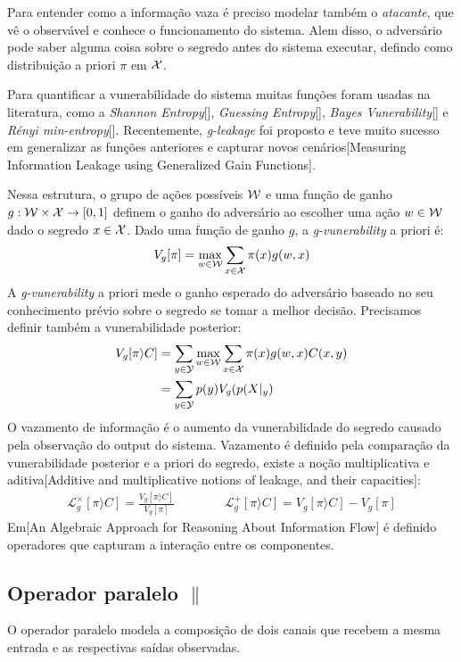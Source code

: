 Para entender como a informação vaza é preciso modelar também o \emph{atacante}, que vê o observável e conhece o funcionamento do sistema. Alem disso, o adversário pode saber alguma coisa sobre o segredo antes do sistema executar, defindo como distribuição a priori $\pi$ em $\mathcal{X}$.

Para quantificar a vunerabilidade do sistema muitas funções foram usadas na literatura, como a \emph{Shannon Entropy}[], \emph{Guessing Entropy}[], \emph{Bayes Vunerability}[] e \emph{Rényi min-entropy}[]. Recentemente, \emph{g-leakage} foi proposto e teve muito sucesso em generalizar as funções anteriores e capturar novos cenários[Measuring Information Leakage using Generalized Gain Functions].

Nessa estrutura, o grupo de ações possíveis $\mathcal{W}$ e uma função de ganho $g:\mathcal{W} \times \mathcal{X} \rightarrow [0,1]$ definem o ganho do adversário ao escolher uma ação $w\in\mathcal{W}$ dado o segredo $x\in\mathcal{X}$. Dado uma função de ganho $g$, a \emph{g-vunerability} a priori é:
$$ V_g[\pi] = \max_{w\in\mathcal{W}} \sum_{x\in\mathcal{X}} \pi(x)g(w,x) $$
A \emph{g-vunerability} a priori mede o ganho esperado do adversário baseado no seu conhecimento prévio sobre o segredo se tomar a melhor decisão. Precisamos definir também a vunerabilidade posterior:
\begin{align*}
V_g[\pi\rangle C]  & = \sum_{y\in\mathcal{Y}} \max_{w\in\mathcal{W}} \sum_{x\in\mathcal{X}} \pi(x)g(w,x)C(x,y) \\
& = \sum_{y\in\mathcal{Y}} p(y) V_g(p(X|_y)
\end{align*}
O vazamento de informação é o aumento da vunerabilidade do segredo causado pela observação do output do sistema. 
Vazamento é definido pela comparação da vunerabilidade posterior e a priori do segredo, existe a noção multiplicativa e aditiva[Additive and multiplicative notions of leakage, and their capacities]:
\begin{align*}
\mathcal{L}^{\times}_{g}[\pi\rangle C] = \frac{V_g[\pi\rangle C]}{V_g[\pi]}&\hspace{1cm}&\mathcal{L}^{+}_{g}[\pi\rangle C] = {V_g[\pi\rangle C]} - {V_g[\pi]}
\end{align*}
Em[An Algebraic Approach for Reasoning About Information Flow] é definido operadores que capturam a interação entre os componentes. 
\subsection*{Operador paralelo $\parallel$}  
O operador paralelo modela a composição de dois canais que recebem a mesma entrada e as respectivas saídas observadas. 

